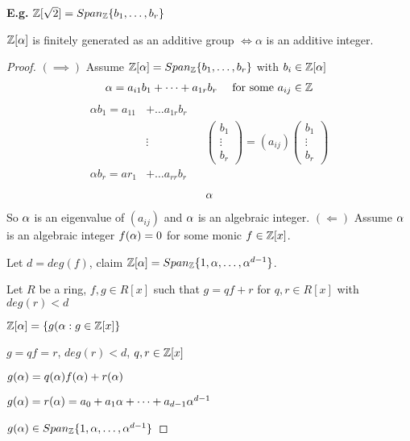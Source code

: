 \documentclass[11pt]{article}
\begin{document}
\spa
\textbf{E.g.} $\mathbb{Z}[\sqrt{2}] = Span_{\mathbb{Z}}\{b_1, \dots, b_r\}$


\begin{prop}
	$\mathbb{Z}[\alpha]$ is finitely generated as an additive group $\iff \alpha$ is an additive integer.
\end{prop}

\begin{proof}
	$(\implies)$ Assume $\mathbb{Z}[\alpha] = Span_{\mathbb{Z}}\{b_1, \dots, b_r \}$ with $b_i \in \mathbb{Z}[\alpha]$
	\begin{align*}
		\alpha = a_{i1}b_1 + \dots + a_{1r}b_r && \text{ for some } a_{ij} \in \mathbb{Z}
	\end{align*}
	\begin{align*}
		\alpha b_1 = a_{11}& + \dots a_{1r}b_r \\ 
		&\vdots&& 	\begin{pmatrix}
b_1\\
\vdots\\
b_r
		\end{pmatrix}
		 = 
		 (a_{ij}) 
		\begin{pmatrix}
b_1\\
\vdots\\
b_r
		\end{pmatrix}
\\
		\alpha b_r = a r_1& + \dots a_{rr}b_r
	\end{align*}
	\begin{align*}
		\alpha
	\end{align*}
	So $\alpha$ is an eigenvalue of $(a_{ij})$ and $\alpha$ is an algebraic integer.
	\spac $(\Longleftarrow)$ Assume $\alpha$ is an algebraic integer $f(\alpha)=0$ for some monic $ f \in \mathbb{Z}[x]$.
	
	Let $d=deg(f)$, claim $\mathbb{Z}[\alpha] = Span_{\mathbb{Z}}\{1,\alpha, \dots, \alpha^{d-1} \}$.

	Let $R$ be a ring, $f,g \in R[x]$ such that $g=qf+r$ for $q,r \in R[x]$ with $deg(r)<d$
\spa

	$\mathbb{Z}[\alpha]=\{g(\alpha : g \in \mathbb{Z}[x]\}$
	\spa

	$g = qf=r$, \hspace{7pt} $deg(r) < d$, \hspace{7pt} $q,r \in \mathbb{Z}[x]$
\spa

	$g(\alpha) = q(\alpha)f(\alpha) + r(\alpha)$
	\spa

	$g(\alpha) = r(\alpha) = a_0 + a_1\alpha + \dots + a_{d-1} \alpha^{d-1}$
	\spa

	$g(\alpha) \in Span_{\mathbb{Z}} \{ 1, \alpha, \dots, \alpha^{d-1} \} $
\end{proof}
\end{document}
